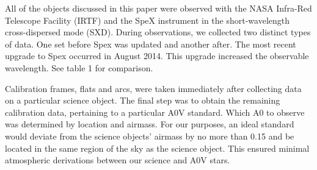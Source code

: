 
All of the objects discussed in this paper were observed with the NASA Infra-Red Telescope Facility (IRTF) and the SpeX instrument \cite{Rayner_1998} in the short-wavelength cross-dispersed mode (SXD).  During observations, we collected two distinct types of data.  One set before Spex was updated and another after.  The most recent upgrade to Spex occurred in August 2014.  This upgrade increased the observable wavelength.  See table 1 for comparison.


Calibration frames, flats and arcs, were taken immediately after collecting data on a particular science object.  The final step was to obtain the remaining calibration data, pertaining to a particular A0V standard.  Which A0 to observe was determined by location and airmass.  For our purposes, an ideal standard would deviate from the science objects' airmass by no more than 0.15 and be located in the same region of the sky as the science object.  This ensured minimal atmospheric derivations between our science and A0V stars.
